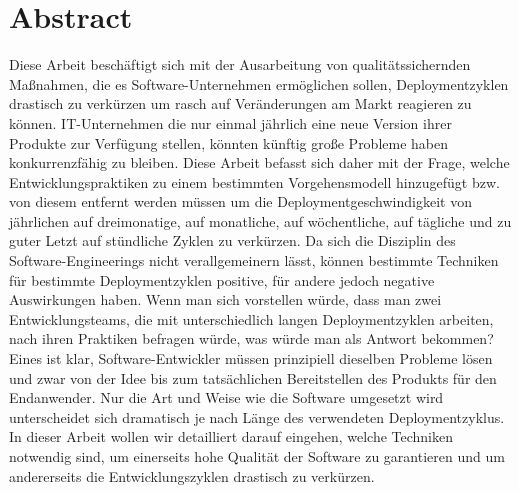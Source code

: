 \section*{Abstract}

Diese Arbeit beschäftigt sich mit der Ausarbeitung von qualitätssichernden Maßnahmen, die es Software-Unternehmen ermöglichen sollen, Deploymentzyklen drastisch zu verkürzen um rasch auf Veränderungen am Markt reagieren zu können. IT-Unternehmen die nur einmal jährlich eine neue Version ihrer Produkte zur Verfügung stellen, könnten künftig große Probleme haben konkurrenzfähig zu bleiben. Diese Arbeit befasst sich daher mit der Frage, welche Entwicklungspraktiken zu einem bestimmten Vorgehensmodell hinzugefügt bzw. von diesem entfernt werden müssen um die Deploymentgeschwindigkeit von jährlichen auf dreimonatige, auf monatliche, auf wöchentliche, auf tägliche und zu guter Letzt auf stündliche Zyklen zu verkürzen. Da sich die Disziplin des Software-Engineerings nicht verallgemeinern lässt, können bestimmte Techniken für bestimmte Deploymentzyklen positive, für andere jedoch negative Auswirkungen haben. Wenn man sich vorstellen würde, dass man zwei Entwicklungsteams, die mit unterschiedlich langen Deploymentzyklen arbeiten, nach ihren Praktiken befragen würde, was würde man als Antwort bekommen? Eines ist klar, Software-Entwickler müssen prinzipiell dieselben Probleme lösen und zwar von der Idee bis zum tatsächlichen Bereitstellen des Produkts für den Endanwender. Nur die Art und Weise wie die Software umgesetzt wird unterscheidet sich dramatisch je nach Länge des verwendeten Deploymentzyklus. In dieser Arbeit wollen wir detailliert darauf eingehen, welche Techniken notwendig sind, um einerseits hohe Qualität der Software zu garantieren und um andererseits die Entwicklungszyklen drastisch zu verkürzen.
